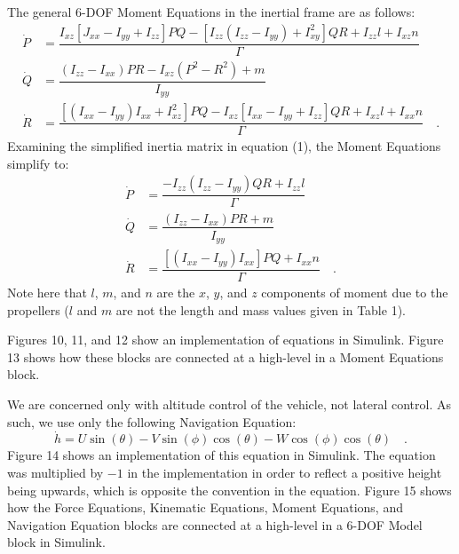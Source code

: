 The general 6-DOF Moment Equations in the inertial frame are as follows:
\begin{align*}
    \dot{P} &= \dfrac{I_{xz}[ J_{xx} - I_{yy} + I_{zz} ]PQ - [ I_{zz}(I_{zz} - I_{yy}) + I_{xy}^2 ]QR + I_{zz} l + I_{xz} n}{\Gamma} \\
    \dot{Q} &= \dfrac{(I_{zz} - I_{xx})PR - I_{xz}(P^2 - R^2) + m}{I_{yy}} \\
    \dot{R} &= \dfrac{[(I_{xx} - I_{yy})I_{xx} + I_{xz}^2]PQ - I_{xz}[I_{xx} - I_{yy} + I_{zz}]QR + I_{xz} l + I_{xx} n}{\Gamma} \quad .
\end{align*}
Examining the simplified inertia matrix in equation (1), the Moment Equations simplify to:
\begin{align}
    \dot{P} &= \dfrac{-I_{zz}(I_{zz} - I_{yy})QR + I_{zz} l}{\Gamma} \\
    \dot{Q} &= \dfrac{(I_{zz} - I_{xx})PR + m}{I_{yy}} \\
    \dot{R} &= \dfrac{[(I_{xx} - I_{yy})I_{xx}]PQ + I_{xx} n}{\Gamma} \quad .
\end{align}
\noindent Note here that $l$, $m$, and $n$ are the $x$, $y$, and $z$ components of moment due to the propellers ($l$ and $m$ are not the length and mass values given in Table 1).

Figures 10, 11, and 12 show an implementation of equations in Simulink. Figure 13 shows how these blocks are connected at a high-level in a Moment Equations block.

We are concerned only with altitude control of the vehicle, not lateral control. As such, we use only the following Navigation Equation:
\begin{equation}
    \dot{h} = U\sin(\theta) - V\sin(\phi)\cos(\theta) - W\cos(\phi)\cos(\theta) \quad .
\end{equation}
Figure 14 shows an implementation of this equation in Simulink. The equation was multiplied by $-1$ in the implementation in order to reflect a positive height being upwards, which is opposite the convention in the equation. Figure 15 shows how the Force Equations, Kinematic Equations, Moment Equations, and Navigation Equation blocks are connected at a high-level in a 6-DOF Model block in Simulink.